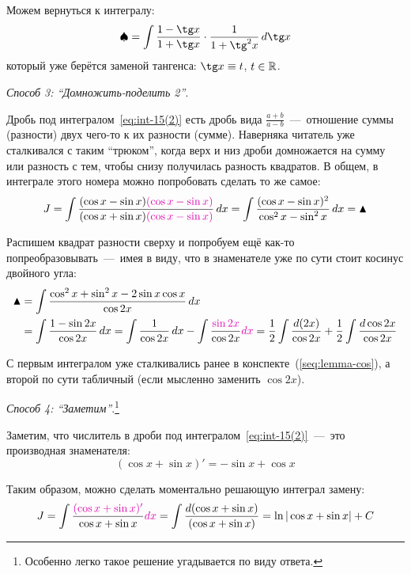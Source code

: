 \documentclass[a4paper,12pt]{article}
\newcommand{\diff}{\mathop{}\!d}
\begin{document}
\begin{solution}
    Можем вернуться к интегралу:
    \[
      \spadesuit = \int \frac{1 - \tg x}{1 + \tg x} \cdot \frac{1}{1 + \tg^2 x} \diff \tg x
    \]
    который уже берётся заменой тангенса: $\tg x \hm\equiv t$, $t \hm\in \RR$.

    \medskip

    \noindent
    \emph{Способ 3: ``Домножить-поделить 2''}.

    Дробь под интегралом~\eqref{eq:int-15(2)} есть дробь вида $\frac{a + b}{a - b}$~---~отношение суммы (разности) двух чего-то к их разности (сумме).
    Наверняка читатель уже сталкивался с таким ``трюком'', когда верх и низ дроби домножается на сумму или разность с тем, чтобы снизу получилась разность квадратов.
    В общем, в интеграле этого номера можно попробовать сделать то же самое:
    \[
      J = \int \frac{(\cos x - \sin x)\textcolor{pink}{(\cos x - \sin x)}}{(\cos x + \sin x)\textcolor{pink}{(\cos x - \sin x)}} \diff x
      = \int \frac{(\cos x - \sin x)^2}{\cos^2 x - \sin^2 x} \diff x = \blacktriangle
    \]

    Распишем квадрат разности сверху и попробуем ещё как-то попреобразовывать~---~имея в виду, что в знаменателе уже по сути стоит косинус двойного угла:
    \begin{equation*}
    \begin{split}
      \blacktriangle &= \int \frac{\cos^2 x + \sin^2 x - 2\sin x \cos x}{\cos 2x} \diff x\\
      &= \int \frac{1 - \sin 2x}{\cos 2x} \diff x
      = \int \frac{1}{\cos 2x} \diff x - \int \frac{\textcolor{pink}{\sin 2x}}{\cos 2x} \textcolor{pink}{\diff x}
      = \frac{1}{2} \int \frac{\diff (2x)}{\cos 2x} + \frac{1}{2} \int \frac{\diff \cos 2x}{\cos 2x}
    \end{split}
    \end{equation*}

    С первым интегралом уже сталкивались ранее в конспекте~(\ref{seq:lemma-cos}), а второй по сути табличный (если мысленно заменить $\cos 2x$).

    \medskip

    \noindent
    \emph{Способ 4: ``Заметим''}.\footnote{
      Особенно легко такое решение угадывается по виду ответа.
    }

    Заметим, что числитель в дроби под интегралом~\eqref{eq:int-15(2)}~---~это производная знаменателя:
    \[
      (\cos x + \sin x)' = -\sin x + \cos x
    \]

    Таким образом, можно сделать моментально решающую интеграл замену:
    \[
      J = \int \frac{\textcolor{pink}{(\cos x + \sin x)'}}{\cos x + \sin x} \textcolor{pink}{\diff x}
      = \int \frac{\diff (\cos x + \sin x)}{(\cos x + \sin x)}
      = \ln |\cos x + \sin x| + C
    \]
  \end{solution}
\end{document}

